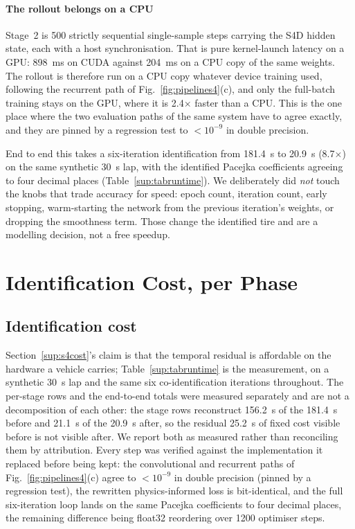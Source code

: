 \paragraph{The rollout belongs on a CPU}
Stage~2 is 500 strictly sequential single-sample steps carrying the S4D hidden
state, each with a host synchronisation. That is pure kernel-launch latency on
a GPU: \SI{898}{\milli\second} on CUDA against \SI{204}{\milli\second} on a CPU
copy of the same weights. The rollout is therefore run on a CPU copy whatever
device training used, following the recurrent path of
Fig.~\ref{fig:pipelines4}(c), and only the full-batch training stays on the
GPU, where it is \num{2.4}$\times$ faster than a CPU. This is the one place where the two evaluation paths of the
same system have to agree exactly, and they are pinned by a regression test to
$<10^{-9}$ in double precision.

End to end this takes a six-iteration identification from \SI{181.4}{\second}
to \SI{20.9}{\second} (\num{8.7}$\times$) on the same synthetic
\SI{30}{\second} lap, with the identified Pacejka coefficients agreeing to four
decimal places (Table~\ref{sup:tabruntime}). We deliberately did \emph{not}
touch the knobs that trade accuracy for speed: epoch count, iteration count,
early stopping, warm-starting the network from the previous iteration's
weights, or dropping the smoothness term. Those change the identified tire and
are a modelling decision, not a free speedup.

\section{Identification Cost, per Phase}
\label{sup:runtime}

\subsection{Identification cost}

Section~\ref{sup:s4cost}'s claim is that the temporal residual is affordable
on the hardware a vehicle carries; Table~\ref{sup:tabruntime} is the measurement,
on a synthetic \SI{30}{\second} lap and the same six co-identification
iterations throughout. The per-stage rows and the end-to-end totals were
measured separately and are not a decomposition of each other: the stage rows
reconstruct \SI{156.2}{\second} of the \SI{181.4}{\second} before and
\SI{21.1}{\second} of the \SI{20.9}{\second} after, so the residual
\SI{25.2}{\second} of fixed cost visible before is not visible after. We
report both as measured rather than reconciling them by attribution. Every
step was verified against the implementation it replaced before being kept: the convolutional and recurrent paths of
Fig.~\ref{fig:pipelines4}(c) agree to $<10^{-9}$ in double precision (pinned by
a regression test), the rewritten physics-informed loss is bit-identical, and
the full six-iteration loop lands on the same Pacejka coefficients to four
decimal places, the remaining difference being float32 reordering over
\num{1200} optimiser steps.

